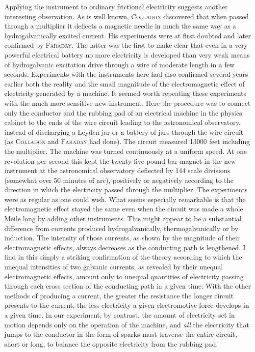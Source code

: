 Applying the instrument to ordinary frictional electricity suggests another interesting observation. As is well known, \textsc{Colladon} discovered that when passed through a multiplier it deflects a magnetic needle in much the same way as a hydrogalvanically excited current. His experiments were at first doubted and later confirmed by \textsc{Faraday}. The latter was the first to make clear that even in a very powerful electrical battery no more electricity is developed than very weak means of hydrogalvanic excitation drive through a wire of moderate length in a few seconds. Experiments with the instruments here had also confirmed several years earlier both the reality and the small magnitude of the electromagnetic effect of electricity generated by a machine. It seemed worth repeating these experiments with the much more sensitive new instrument. Here the procedure was to connect only the conductor and the rubbing pad of an electrical machine in the physics cabinet to the ends of the wire circuit leading to the astronomical observatory, instead of discharging a Leyden jar or a battery of jars through the wire circuit (as \textsc{Colladon} and \textsc{Faraday} had done). The circuit measured 13000 feet including the multiplier. The machine was turned continuously at a uniform speed. At one revolution per second this kept the twenty-five-pound bar magnet in the new instrument at the astronomical observatory deflected by 144 scale divisions (somewhat over 50 minutes of arc), positively or negatively according to the direction in which the electricity passed through the multiplier. The experiments were as regular as one could wish. What seems especially remarkable is that the electromagnetic effect stayed the same even when the circuit was made a whole Meile long by adding other instruments. This might appear to be a substantial difference from currents produced hydrogalvanically, thermogalvanically or by induction. The intensity of those currents, as shown by the magnitude of their electromagnetic effects, always decreases as the conducting path is lengthened. I find in this simply a striking confirmation of the theory according to which the unequal intensities of two galvanic currents, as revealed by their unequal electromagnetic effects, amount only to unequal quantities of electricity passing through each cross section of the conducting path in a given time.
With the other methods of producing a current, the greater the resistance the longer circuit presents to the current, the less electricity a given electromotive force develops in a given time. In our experiment, by contrast, the amount of electricity set in motion depends only on the operation of the machine, and \textit{all} the electricity that jumps to the conductor in the form of sparks must traverse the entire circuit, short or long, to balance the opposite electricity from the rubbing pad.

